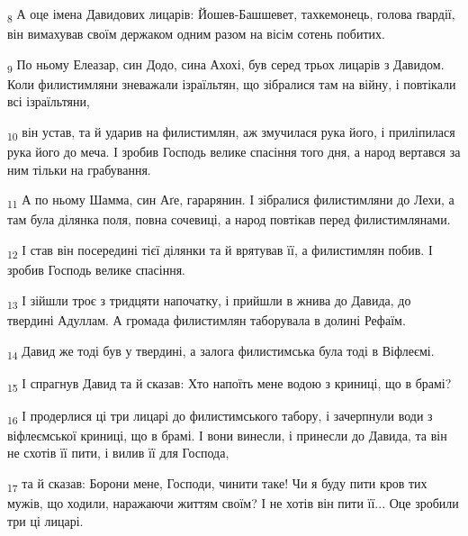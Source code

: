 \begin{tcolorbox}
\textsubscript{8} А оце імена Давидових лицарів: Йошев-Башшевет, тахкемонець, голова ґвардії, він вимахував своїм держаком одним разом на вісім сотень побитих.
\end{tcolorbox}
\begin{tcolorbox}
\textsubscript{9} По ньому Елеазар, син Додо, сина Ахохі, був серед трьох лицарів з Давидом. Коли филистимляни зневажали ізраїльтян, що зібралися там на війну, і повтікали всі ізраїльтяни,
\end{tcolorbox}
\begin{tcolorbox}
\textsubscript{10} він устав, та й ударив на филистимлян, аж змучилася рука його, і приліпилася рука його до меча. І зробив Господь велике спасіння того дня, а народ вертався за ним тільки на грабування.
\end{tcolorbox}
\begin{tcolorbox}
\textsubscript{11} А по ньому Шамма, син Аґе, гарарянин. І зібралися филистимляни до Лехи, а там була ділянка поля, повна сочевиці, а народ повтікав перед филистимлянами.
\end{tcolorbox}
\begin{tcolorbox}
\textsubscript{12} І став він посередині тієї ділянки та й врятував її, а филистимлян побив. І зробив Господь велике спасіння.
\end{tcolorbox}
\begin{tcolorbox}
\textsubscript{13} І зійшли троє з тридцяти напочатку, і прийшли в жнива до Давида, до твердині Адуллам. А громада филистимлян таборувала в долині Рефаїм.
\end{tcolorbox}
\begin{tcolorbox}
\textsubscript{14} Давид же тоді був у твердині, а залога филистимська була тоді в Віфлеємі.
\end{tcolorbox}
\begin{tcolorbox}
\textsubscript{15} І спрагнув Давид та й сказав: Хто напоїть мене водою з криниці, що в брамі?
\end{tcolorbox}
\begin{tcolorbox}
\textsubscript{16} І продерлися ці три лицарі до филистимського табору, і зачерпнули води з віфлеємської криниці, що в брамі. І вони винесли, і принесли до Давида, та він не схотів її пити, і вилив її для Господа,
\end{tcolorbox}
\begin{tcolorbox}
\textsubscript{17} та й сказав: Борони мене, Господи, чинити таке! Чи я буду пити кров тих мужів, що ходили, наражаючи життям своїм? І не хотів він пити її... Оце зробили три ці лицарі.
\end{tcolorbox}
